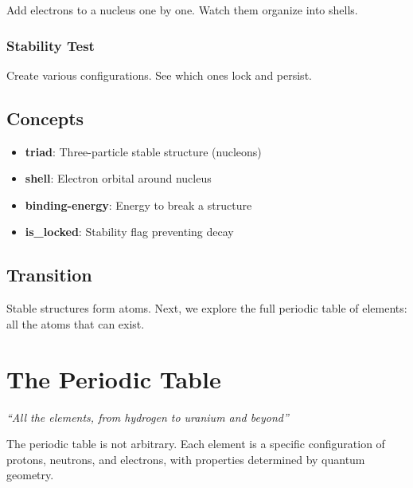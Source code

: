 \documentclass[
  11pt,
  letterpaper,
  twoside,
  openright]{book}
\providecommand{\tightlist}{%
  \setlength{\itemsep}{0pt}\setlength{\parskip}{0pt}}
\begin{document}
Add electrons to a nucleus one by one. Watch them organize into shells.

\subsection{Stability Test}\label{stability-test}

Create various configurations. See which ones lock and persist.

\section{Concepts}\label{concepts}

\begin{itemize}
\tightlist
\item
  \textbf{triad}: Three-particle stable structure (nucleons)
\item
  \textbf{shell}: Electron orbital around nucleus
\item
  \textbf{binding-energy}: Energy to break a structure
\item
  \textbf{is\_locked}: Stability flag preventing decay
\end{itemize}

\section{Transition}\label{transition}

Stable structures form atoms. Next, we explore the full periodic table
of elements: all the atoms that can exist.

\chapter{The Periodic Table}\label{sec-periodic-table}

\emph{``All the elements, from hydrogen to uranium and beyond''}

\begin{tcolorbox}[enhanced jigsaw, coltitle=black, colbacktitle=quarto-callout-note-color!10!white, toprule=.15mm, colframe=quarto-callout-note-color-frame, arc=.35mm, opacityback=0, bottomtitle=1mm, toptitle=1mm, breakable, colback=white, titlerule=0mm, opacitybacktitle=0.6, title=\textcolor{quarto-callout-note-color}{\faInfo}\hspace{0.5em}{Key Revelation}, rightrule=.15mm, bottomrule=.15mm, leftrule=.75mm, left=2mm]

The periodic table is not arbitrary. Each element is a specific
configuration of protons, neutrons, and electrons, with properties
determined by quantum geometry.

\end{tcolorbox}
\end{document}
